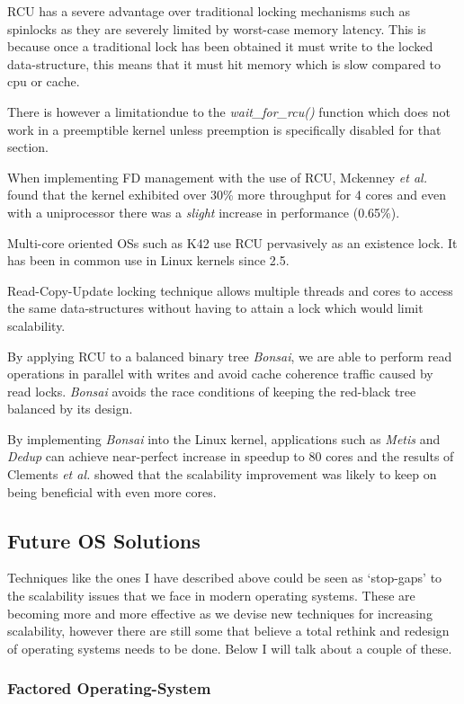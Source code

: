 \documentclass[journal]{IEEEtran}
\begin{document}
RCU has a severe advantage over traditional locking mechanisms such as spinlocks as they are severely limited by worst-case memory latency. This is because once a traditional lock has been obtained it must write to the locked data-structure, this means that it must hit memory which is slow compared to cpu or cache.

There is however a limitationdue to the \emph{wait\_for\_rcu()} function which does not work in a preemptible kernel unless preemption is specifically disabled for that section.

When implementing FD management with the use of RCU, Mckenney \emph{et al.} \cite{RCU} found that the kernel exhibited over 30\% more throughput for 4 cores and even with a uniprocessor there was a \emph{slight} increase in performance (0.65\%).

Multi-core oriented OSs such as K42 \cite{K42} use RCU pervasively as an existence lock. It has been in common use in Linux kernels since 2.5.

Read-Copy-Update locking technique allows multiple threads and cores to access the same data-structures without having to attain a lock which would limit scalability.

By applying RCU to a balanced binary tree \cite{Bonsai} \emph{Bonsai}, we are able to perform read operations in parallel with writes and avoid cache coherence traffic caused by read locks. \emph{Bonsai} avoids the race conditions of keeping the red-black tree balanced by its design.

By implementing \emph{Bonsai} into the Linux kernel, applications such as \emph{Metis} and \emph{Dedup} can achieve near-perfect increase in speedup to 80 cores and the results of Clements \emph{et al.} showed that the scalability improvement was likely to keep on being beneficial with even more cores.

\subsection{Future OS Solutions}

Techniques like the ones I have described above could be seen as `stop-gaps' to the scalability issues that we face in modern operating systems. These are becoming more and more effective as we devise new techniques for increasing scalability, however there are still some that believe a total rethink and redesign of operating systems needs to be done. Below I will talk about a couple of these.

\subsubsection{Factored Operating-System}
\end{document}
